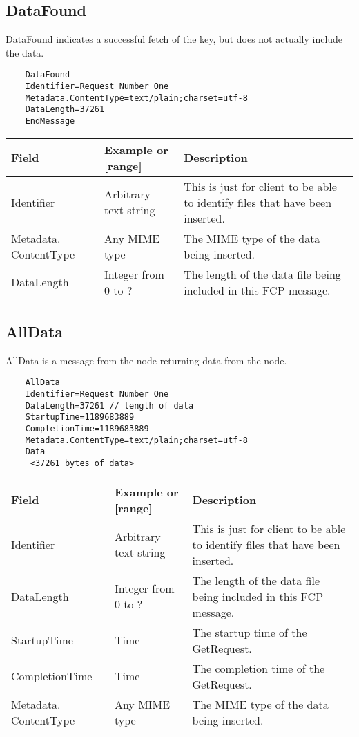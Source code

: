 \subsection{DataFound}
DataFound indicates a successful fetch of the key, but does not actually include the data.
\begin{verbatim}
    DataFound
    Identifier=Request Number One
    Metadata.ContentType=text/plain;charset=utf-8
    DataLength=37261
    EndMessage
\end{verbatim}
\begin{tabularx}{\textwidth}{p{3cm}|p{3cm}|p{7.5cm}}
\toprule
    Field & Example or [range] & Description \\
\midrule 
Identifier & Arbitrary text string & This is just for client to be able to identify files that have been inserted. \\
\addlinespace
\hline
\addlinespace
Metadata. ContentType & Any MIME type & The MIME type of the data being inserted. \\
\addlinespace
\hline
\addlinespace
DataLength & Integer from 0 to ? & The length of the data file being included in this FCP message. \\
\bottomrule
\end{tabularx}
\newpage
\subsection{AllData}
AllData is a message from the node returning data from the node.
\begin{verbatim}
    AllData
    Identifier=Request Number One
    DataLength=37261 // length of data
    StartupTime=1189683889
    CompletionTime=1189683889
    Metadata.ContentType=text/plain;charset=utf-8
    Data
     <37261 bytes of data>
\end{verbatim}
\begin{tabularx}{\textwidth}{p{3cm}|p{3cm}|p{7.5cm}}
\toprule
    Field & Example or [range] & Description \\
\midrule 
Identifier & Arbitrary text string & This is just for client to be able to identify files that have been inserted. \\
\addlinespace
\hline
\addlinespace
DataLength & Integer from 0 to ? & The length of the data file being included in this FCP message. \\
\addlinespace
\hline
\addlinespace
StartupTime & Time & The startup time of the GetRequest. \\
\addlinespace
\hline
\addlinespace
CompletionTime & Time & The completion time of the GetRequest. \\
\addlinespace
\hline
\addlinespace
Metadata. ContentType & Any MIME type & The MIME type of the data being inserted. \\
\bottomrule
\end{tabularx}
\newpage
